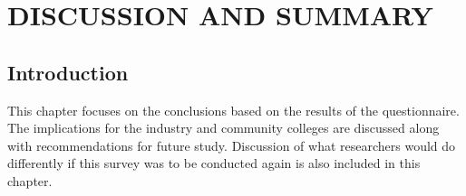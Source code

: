 \chapter{DISCUSSION AND SUMMARY}

\section{Introduction}
This chapter focuses on the conclusions based on the results of the questionnaire. The implications for the industry and community colleges are discussed along with recommendations for future study. Discussion of what researchers would do differently if this survey was to be conducted again is also included in this chapter.

